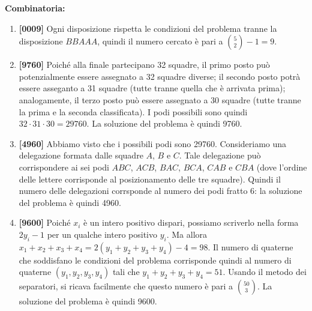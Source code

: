 \documentclass{article}
\begin{document}
\pagestyle{fancy}

\textbf{Combinatoria:}
\begin{enumerate}
	\item \textbf{[0009]} Ogni disposizione rispetta le condizioni del
		problema tranne la disposizione $BBAAA$,
		quindi il numero cercato è pari a $\binom{5}{2}-1=9$.

	\item \textbf{[9760]} Poiché alla finale partecipano
		32 squadre, il primo posto può potenzialmente essere assegnato
		a 32 squadre diverse; il secondo posto potrà essere asseganto
		a 31 squadre (tutte tranne quella che è arrivata prima); analogamente,
		il terzo posto può essere assegnato a 30 squadre (tutte tranne la
		prima e la seconda classificata). I podi possibili sono quindi
		$32\cdot 31\cdot 30=29760$. La soluzione del problema è quindi 9760.
	
	\item \textbf{[4960]} Abbiamo visto che i possibili podi sono 29760.
		Consideriamo una delegazione formata dalle squadre $A$, $B$ e $C$.
		Tale delegazione può corrispondere ai sei podi $ABC$, $ACB$, $BAC$, $BCA$,
		$CAB$ e $CBA$ (dove l'ordine delle lettere corrisponde al posizionamento
		delle tre squadre).
		Quindi il numero delle delegazioni corrsponde al numero
		dei podi fratto 6: la soluzione del problema è quindi 4960.

	\item \textbf{[9600]} Poiché $x_i$ è un intero positivo
		dispari, possiamo scriverlo
		nella forma $2y_i-1$ per un qualche intero positivo $y_i$. Ma allora
		$x_1+x_2+x_3+x_4=2(y_1+y_2+y_3+y_4)-4=98$. Il numero di quaterne
		che soddisfano le condizioni del problema corrisponde quindi
		al numero di quaterne $(y_1,y_2,y_3,y_4)$ tali che
		$y_1+y_2+y_3+y_4=51$. Usando il metodo dei separatori, si ricava
		facilmente che questo numero è pari a $\binom{50}{3}$. La soluzione
		del problema è quindi 9600.
\end{enumerate}
\end{document}
